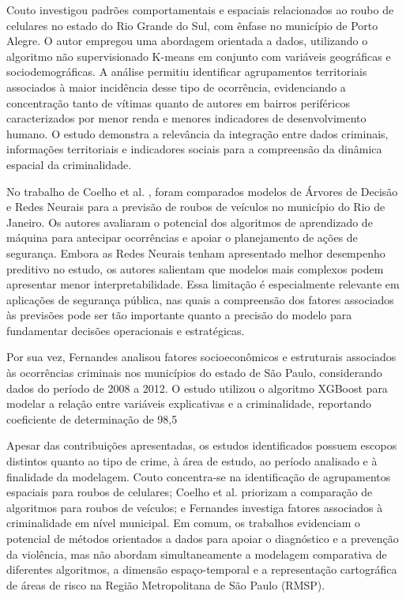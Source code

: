 \documentclass[12pt]{article}
\begin{document}
Couto \cite{couto2024identificaccao} investigou padrões comportamentais e espaciais relacionados ao roubo de celulares no estado do Rio Grande do Sul, com ênfase no município de Porto Alegre. O autor empregou uma abordagem orientada a dados, utilizando o algoritmo não supervisionado K-means em conjunto com variáveis geográficas e sociodemográficas. A análise permitiu identificar agrupamentos territoriais associados à maior incidência desse tipo de ocorrência, evidenciando a concentração tanto de vítimas quanto de autores em bairros periféricos caracterizados por menor renda e menores indicadores de desenvolvimento humano. O estudo demonstra a relevância da integração entre dados criminais, informações territoriais e indicadores sociais para a compreensão da dinâmica espacial da criminalidade.

No trabalho de Coelho et al. \cite{de2025previsao}, foram comparados modelos de Árvores de Decisão e Redes Neurais para a previsão de roubos de veículos no município do Rio de Janeiro. Os autores avaliaram o potencial dos algoritmos de aprendizado de máquina para antecipar ocorrências e apoiar o planejamento de ações de segurança. Embora as Redes Neurais tenham apresentado melhor desempenho preditivo no estudo, os autores salientam que modelos mais complexos podem apresentar menor interpretabilidade. Essa limitação é especialmente relevante em aplicações de segurança pública, nas quais a compreensão dos fatores associados às previsões pode ser tão importante quanto a precisão do modelo para fundamentar decisões operacionais e estratégicas.

Por sua vez, Fernandes \cite{fernandes2025aplicaccao} analisou fatores socioeconômicos e estruturais associados às ocorrências criminais nos municípios do estado de São Paulo, considerando dados do período de 2008 a 2012. O estudo utilizou o algoritmo XGBoost para modelar a relação entre variáveis explicativas e a criminalidade, reportando coeficiente de determinação de 98,5%

Apesar das contribuições apresentadas, os estudos identificados possuem escopos distintos quanto ao tipo de crime, à área de estudo, ao período analisado e à finalidade da modelagem. Couto \cite{couto2024identificaccao} concentra-se na identificação de agrupamentos espaciais para roubos de celulares; Coelho et al. \cite{de2025previsao} priorizam a comparação de algoritmos para roubos de veículos; e Fernandes \cite{fernandes2025aplicaccao} investiga fatores associados à criminalidade em nível municipal. Em comum, os trabalhos evidenciam o potencial de métodos orientados a dados para apoiar o diagnóstico e a prevenção da violência, mas não abordam simultaneamente a modelagem comparativa de diferentes algoritmos, a dimensão espaço-temporal e a representação cartográfica de áreas de risco na Região Metropolitana de São Paulo (RMSP).
\end{document}
